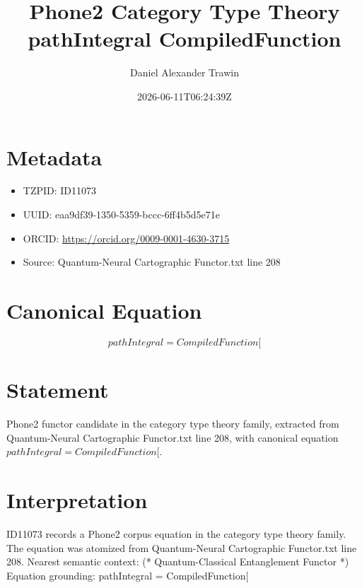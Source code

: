 \documentclass[11pt]{article}
\title{Phone2 Category Type Theory pathIntegral CompiledFunction}
\author{Daniel Alexander Trawin}
\date{2026-06-11T06:24:39Z}
\begin{document}
\maketitle
\section*{Metadata}
\begin{itemize}
\item TZPID: ID11073
\item UUID: eaa9df39-1350-5359-bccc-6ff4b5d5e71e
\item ORCID: \url{https://orcid.org/0009-0001-4630-3715}
\item Source: Quantum-Neural Cartographic Functor.txt line 208
\end{itemize}
\section*{Canonical Equation}
\[
pathIntegral = CompiledFunction[
\]
\section*{Statement}
Phone2 functor candidate in the category type theory family, extracted from Quantum-Neural Cartographic Functor.txt line 208, with canonical equation $pathIntegral = CompiledFunction[$.
\section*{Interpretation}
ID11073 records a Phone2 corpus equation in the category type theory family. The equation was atomized from Quantum-Neural Cartographic Functor.txt line 208. Nearest semantic context: (* Quantum-Classical Entanglement Functor *) Equation grounding: pathIntegral = CompiledFunction[
\end{document}
